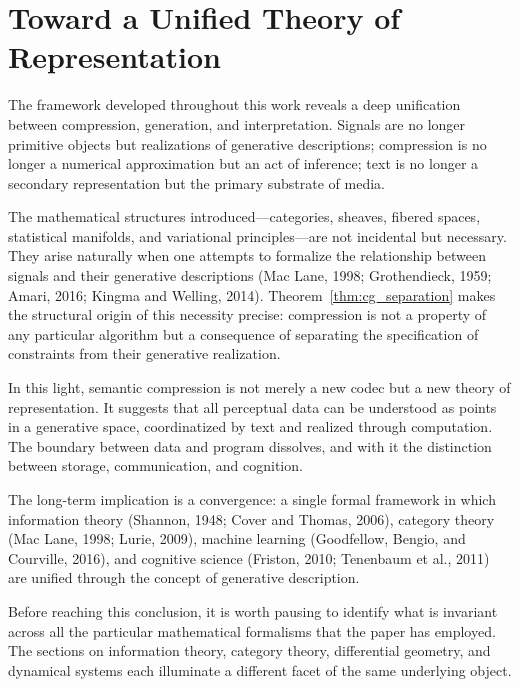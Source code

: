 \documentclass[11pt,a4paper]{article}
\theoremstyle{definition}
\theoremstyle{remark}
\begin{document}
\section{Toward a Unified Theory of Representation}
\label{sec:final_conclusion}

The framework developed throughout this work reveals a deep unification between compression, generation, and interpretation. Signals are no longer primitive objects but realizations of generative descriptions; compression is no longer a numerical approximation but an act of inference; text is no longer a secondary representation but the primary substrate of media.

The mathematical structures introduced---categories, sheaves, fibered spaces, statistical manifolds, and variational principles---are not incidental but necessary. They arise naturally when one attempts to formalize the relationship between signals and their generative descriptions (Mac Lane, 1998; Grothendieck, 1959; Amari, 2016; Kingma and Welling, 2014). Theorem~\ref{thm:cg_separation} makes the structural origin of this necessity precise: compression is not a property of any particular algorithm but a consequence of separating the specification of constraints from their generative realization.

In this light, semantic compression is not merely a new codec but a new theory of representation. It suggests that all perceptual data can be understood as points in a generative space, coordinatized by text and realized through computation. The boundary between data and program dissolves, and with it the distinction between storage, communication, and cognition.

The long-term implication is a convergence: a single formal framework in which information theory (Shannon, 1948; Cover and Thomas, 2006), category theory (Mac Lane, 1998; Lurie, 2009), machine learning (Goodfellow, Bengio, and Courville, 2016), and cognitive science (Friston, 2010; Tenenbaum et al., 2011) are unified through the concept of generative description.

Before reaching this conclusion, it is worth pausing to identify what is invariant across all the particular mathematical formalisms that the paper has employed. The sections on information theory, category theory, differential geometry, and dynamical systems each illuminate a different facet of the same underlying object.
\end{document}

